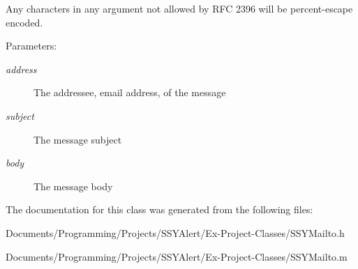 Any characters in any argument not allowed by RFC 2396 will be percent-escape encoded. \begin{Desc}
\item[Parameters:]
\begin{description}
\item[{\em address}]The addressee, email address, of the message \item[{\em subject}]The message subject \item[{\em body}]The message body \end{description}
\end{Desc}


The documentation for this class was generated from the following files:\begin{CompactItemize}
\item 
Documents/Programming/Projects/SSYAlert/Ex-Project-Classes/SSYMailto.h\item 
Documents/Programming/Projects/SSYAlert/Ex-Project-Classes/SSYMailto.m\end{CompactItemize}
